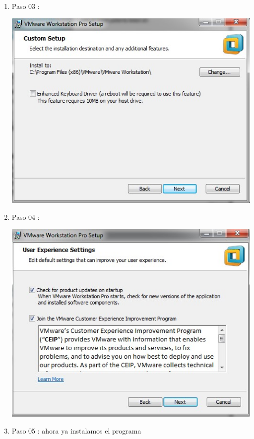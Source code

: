 \begin{enumerate}[1.]
	\item Paso 03 :

	\begin{center}
	\includegraphics[width=15cm]{./Imagenes/WM03} 
	\end{center}

	\item Paso 04 :

	\begin{center}
	\includegraphics[width=15cm]{./Imagenes/WM04} 
	\end{center}

	\item Paso 05 : ahora ya instalamos el programa


\end{enumerate}
